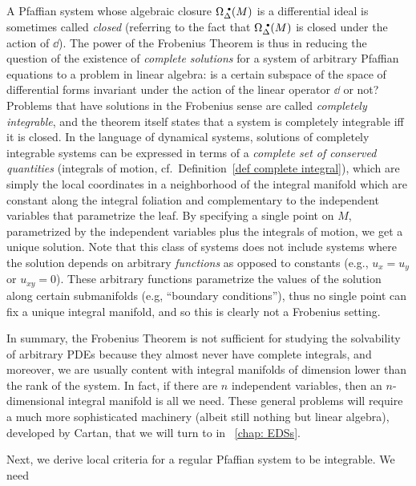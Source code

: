\begin{rem}\label{rem: complete integrability}
    A Pfaffian system whose algebraic closure $\Omega^{\smbullet}_\Delta(M)$ is a differential ideal is sometimes called \emph{closed} (referring to the fact that $\Omega^{\smbullet}_\Delta(M)$ is closed under the action of $\dd$).
    The power of the Frobenius Theorem is thus in reducing the question of the existence of \emph{complete solutions} for a system of arbitrary Pfaffian equations to a problem in linear algebra: is a certain subspace of the space of differential forms invariant under the action of the linear operator $\dd$ or not? Problems that have solutions in the Frobenius sense are called \emph{completely integrable}, and the theorem itself states that a system is completely integrable iff it is closed. In the language of dynamical systems, solutions of completely integrable systems can be expressed in terms of a \emph{complete set of conserved quantities} (integrals of motion, cf.\ Definition~\ref{def complete integral}), which are simply the local coordinates in a neighborhood of the integral manifold which are constant along the integral foliation and complementary to the independent variables that parametrize the leaf. By specifying a single point on $M$, parametrized by the independent variables plus the integrals of motion, we get a unique solution. Note that this class of systems does not include systems where the solution depends on arbitrary \emph{functions} as opposed to constants (e.g., $u_x=u_y$ or $u_{xy}=0$). These arbitrary functions parametrize the values of the solution along certain submanifolds (e.g, ``boundary conditions''), thus no single point can fix a unique integral manifold, and so this is clearly not a Frobenius setting.
    
    In summary, the Frobenius Theorem is not sufficient for studying the solvability of arbitrary PDEs because they almost never have complete integrals, and moreover, we are usually content with integral manifolds of dimension lower than the rank of the system. In fact, if there are $n$ independent variables, then an $n$-dimensional integral manifold is all we need. These general problems will require a much more sophisticated machinery (albeit still nothing but linear algebra), developed by Cartan, that we will turn to in \Chap~\ref{chap: EDSs}.
\end{rem}

Next, we derive local criteria for a regular Pfaffian system to be integrable. We need

